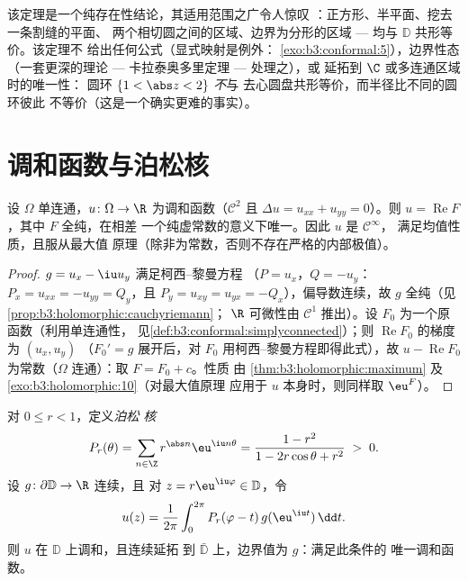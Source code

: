 \begin{remark}\label{rem:b3:conformal:rmtscope}
该定理是一个纯存在性结论，其适用范围之广令人惊叹
：正方形、半平面、挖去一条割缝的平面、
两个相切圆之间的区域、边界为分形的区域
--- 均与 $\mathbb D$ 共形等价。该定理不
给出任何公式（显式映射是例外：
\cref{exo:b3:conformal:5}），边界性态（一套更深的理论
--- 卡拉泰奥多里定理 --- 处理之），或
延拓到 $\C$ 或多连通区域时的唯一性：
圆环 $\{1 < \abs z < 2\}$ \emph{不}与
去心圆盘共形等价，而半径比不同的圆环彼此
不等价（这是一个确实更难的事实）。
\end{remark}

\section{调和函数与泊松核}

\begin{proposition}\label{prop:b3:conformal:harmonicholo}
设 $\Omega$ 单连通，$u \colon \Omega \to \R$
为调和函数（$\mathcal C^2$ 且
$\Delta u = u_{xx} + u_{yy} = 0$）。则 $u =
\operatorname{Re}F$，其中 $F$ 全纯，在相差
一个纯虚常数的意义下唯一。因此 $u$ 是 $\mathcal C^\infty$，
满足均值性质，且服从最大值
原理（除非为常数，否则不存在严格的内部极值）。
\end{proposition}

\begin{proof}
$g = u_x - \iu u_y$ 满足柯西–黎曼方程
（$P = u_x$，$Q = -u_y$：$P_x = u_{xx} = -u_{yy} = Q_y$，且
$P_y = u_{xy} = u_{yx} = -Q_x$），偏导数连续，故 $g$
全纯（见\cref{prop:b3:holomorphic:cauchyriemann}；
$\R$ 可微性由 $\mathcal C^1$ 推出）。设 $F_0$
为一个原函数（利用单连通性，
见\cref{def:b3:conformal:simplyconnected}）；则
$\operatorname{Re}F_0$ 的梯度为 $(u_x, u_y)$
（$F_0' = g$ 展开后，对
$F_0$ 用柯西–黎曼方程即得此式），故 $u - \operatorname{Re}F_0$ 为常数（$\Omega$
连通）：取 $F = F_0 + c$。性质
由 \cref{thm:b3:holomorphic:maximum} 及
\cref{exo:b3:holomorphic:10}（对最大值原理
应用于 $u$ 本身时，则同样取 $\eu^{F}$）。
\end{proof}

\begin{theorem}\label{thm:b3:conformal:poisson}
对 $0 \leq r < 1$，定义\emph{泊松
核}
\[
P_r(\theta) = \sum_{n\in\Z}r^{\abs n}\eu^{\iu n\theta}
= \frac{1 - r^2}{1 - 2r\cos\theta + r^2} \;>\; 0 .
\]
设 $g \colon \partial\mathbb D \to \R$ 连续，且
对 $z = r\eu^{\iu\varphi} \in \mathbb D$，令
\[
u(z) = \frac1{2\pi}\int_0^{2\pi}
P_r(\varphi - t)\,g(\eu^{\iu t})\,\dd t .
\]
则 $u$ 在 $\mathbb D$ 上调和，且连续延拓
到 $\bar{\mathbb D}$ 上，边界值为 $g$：满足此条件的
唯一调和函数。
\end{theorem}

